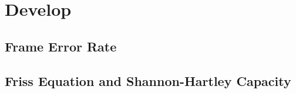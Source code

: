 \section{Develop}


\subsection{Frame Error Rate}

\newpage
\subsection{Friss Equation and Shannon-Hartley Capacity}
